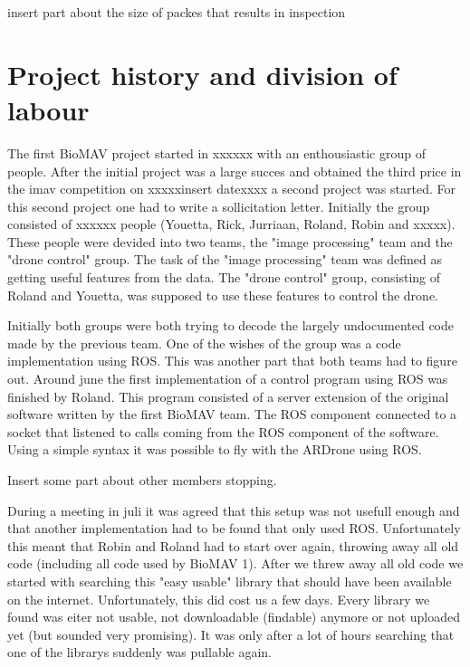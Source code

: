 \documentclass[a4paper,10pt]{article}
\begin{document}
insert part about the size of packes that results in inspection

\section{Project history and division of labour}
The first BioMAV project started in xxxxxx with an enthousiastic group of people. After the initial project was a large succes and obtained the third price in the imav competition on xxxxxinsert datexxxx a second project was started.
For this second project one had to write a sollicitation letter. 
Initially the group consisted of xxxxxx people (Youetta, Rick, Jurriaan, Roland, Robin and xxxxx).  
These people were devided into two teams, the "image processing" team and the "drone control" group. 
The task of the "image processing" team was defined as getting useful features from the data. 
The "drone control" group, consisting of Roland and Youetta, was supposed to use these features to control the drone.  

Initially both groups were both trying to decode the largely undocumented code made by the previous team.
One of the wishes of the group was a code implementation using ROS. This was another part that both teams had to figure out.  
Around june the first implementation of a control program using ROS was finished by Roland. 
This program consisted of a server extension of the original software written by the first BioMAV team.  
The ROS component connected to a socket that listened to calls coming from the ROS component of the software. 
Using a simple syntax it was possible to fly with the ARDrone using ROS.  

Insert some part about other members stopping.

During a meeting in juli it was agreed that this setup was not usefull enough and that another implementation had to be found that only used ROS. 
Unfortunately this meant that Robin and Roland had to start over again, throwing away all old code (including all code used by BioMAV 1).  
After we threw away all old code we started with searching this "easy usable" library that should have been available on the internet. 
Unfortunately, this did cost us a few days. 
Every library we found was eiter not usable, not downloadable (findable) anymore or not uploaded yet (but sounded very promising). 
It was only after a lot of hours searching that one of the librarys suddenly was pullable again. 
\end{document}
